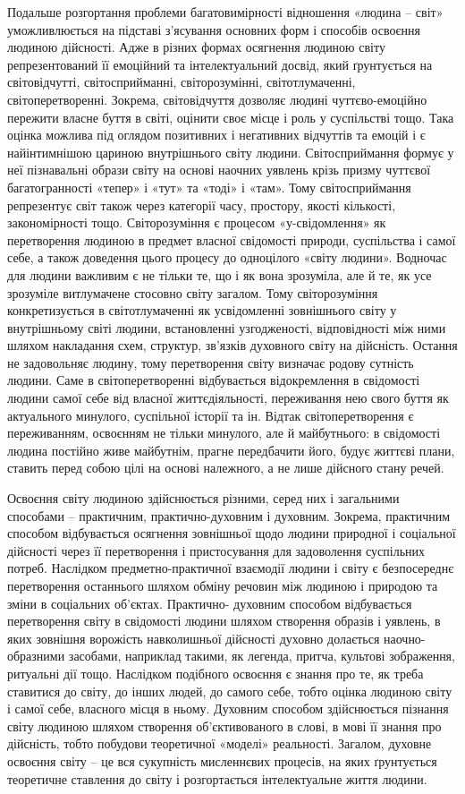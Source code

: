 Подальше розгортання проблеми багатовимірності відношення «людина –
світ» уможливлюється на підставі з’ясування основних форм і способів
освоєння людиною дійсності. Адже в різних формах осягнення людиною світу
репрезентований її емоційний та інтелектуальний досвід, який ґрунтується на
світовідчутті, світосприйманні, світорозумінні, світотлумаченні,
світоперетворенні. Зокрема, світовідчуття дозволяє людині чуттєво-емоційно
пережити власне буття в світі, оцінити своє місце і роль у суспільстві тощо.
Така оцінка можлива під оглядом позитивних і негативних відчуттів та емоцій і
є найінтимнішою цариною внутрішнього світу людини. Світосприймання
формує у неї пізнавальні образи світу на основі наочних уявлень крізь призму
чуттєвої багатогранності «тепер» і «тут» та «тоді» і «там». Тому
світосприймання репрезентує світ також через категорії часу, простору, якості
кількості, закономірності тощо. Світорозуміння є процесом «у-свідомлення» як
перетворення людиною в предмет власної свідомості природи, суспільства і
самої себе, а також доведення цього процесу до одноцілого «світу людини».
Водночас для людини важливим є не тільки те, що і як вона зрозуміла, але й те,
як усе зрозуміле витлумачене стосовно світу загалом. Тому світорозуміння
конкретизується в світотлумаченні як усвідомленні зовнішнього світу у
внутрішньому світі людини, встановленні узгодженості, відповідності між
ними шляхом накладання схем, структур, зв’язків духовного світу на дійсність.
Остання не задовольняє людину, тому перетворення світу визначає родову
сутність людини. Саме в світоперетворенні відбувається відокремлення в
свідомості людини самої себе від власної життєдіяльності, переживання нею
свого буття як актуального минулого, суспільної історії та ін. Відтак
світоперетворення є переживанням, освоєнням не тільки минулого, але й
майбутнього: в свідомості людина постійно живе майбутнім, прагне
передбачити його, будує життєві плани, ставить перед собою цілі на основі
належного, а не лише дійсного стану речей.

Освоєння світу людиною здійснюється різними, серед них і загальними
способами – практичним, практично-духовним і духовним. Зокрема,
практичним способом відбувається осягнення зовнішньої щодо людини
природної і соціальної дійсності через її перетворення і пристосування для
задоволення суспільних потреб. Наслідком предметно-практичної взаємодії
людини і світу є безпосереднє перетворення останнього шляхом обміну
речовин між людиною і природою та зміни в соціальних об’єктах. Практично-
духовним способом відбувається перетворення світу в свідомості людини
шляхом створення образів і уявлень, в яких зовнішня ворожість навколишньої
дійсності духовно долається наочно-образними засобами, наприклад такими, як
легенда, притча, культові зображення, ритуальні дії тощо. Наслідком подібного
освоєння є знання про те, як треба ставитися до світу, до інших людей, до
самого себе, тобто оцінка людиною світу і самої себе, власного місця в ньому.
Духовним способом здійснюється пізнання світу людиною шляхом створення
об’єктивованого в слові, в мові її знання про дійсність, тобто побудови
теоретичної «моделі» реальності. Загалом, духовне освоєння світу – це вся
сукупність мисленнєвих процесів, на яких ґрунтується теоретичне ставлення до
світу і розгортається інтелектуальне життя людини.

